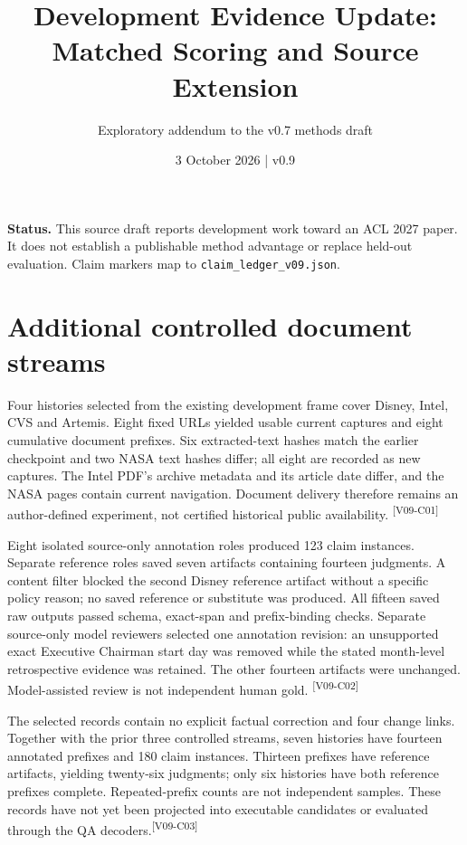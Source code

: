 \documentclass[10pt,letterpaper]{article}
\title{Development Evidence Update: Matched Scoring and Source Extension}
\author{Exploratory addendum to the v0.7 methods draft}
\date{3 October 2026 \quad | \quad v0.9}
\newcommand{\claim}[1]{\textsuperscript{\scriptsize[#1]}}
\begin{document}
\maketitle
\noindent\textbf{Status.} This source draft reports development work toward an
ACL 2027 paper. It does not establish a publishable method advantage or replace
held-out evaluation. Claim markers map to \texttt{claim\_ledger\_v09.json}.

\section{Additional controlled document streams}
\label{sec:sources}
Four histories selected from the existing development frame cover Disney,
Intel, CVS and Artemis. Eight fixed URLs yielded usable current captures and
eight cumulative document prefixes. Six extracted-text hashes match the earlier
checkpoint and two NASA text hashes differ; all eight are recorded as new
captures. The Intel PDF's archive metadata and its article date differ, and the
NASA pages contain current navigation. Document delivery therefore remains an
author-defined experiment, not certified historical public availability.
\claim{V09-C01}

Eight isolated source-only annotation roles produced 123 claim instances.
Separate reference roles saved seven artifacts containing fourteen judgments.
A content filter blocked the second Disney reference artifact without a
specific policy reason; no saved reference or substitute was produced. All
fifteen saved raw outputs passed schema, exact-span and prefix-binding checks.
Separate source-only model reviewers selected one annotation revision: an
unsupported exact Executive Chairman start day was removed while the stated
month-level retrospective evidence was retained. The other fourteen artifacts
were unchanged. Model-assisted review is not independent human gold.
\claim{V09-C02}

The selected records contain no explicit factual correction and four change
links. Together with the prior three controlled streams, seven histories have
fourteen annotated prefixes and 180 claim instances. Thirteen prefixes have
reference artifacts, yielding twenty-six judgments; only six histories have
both reference prefixes complete. Repeated-prefix counts are not independent
samples. These records have not yet been projected into executable candidates
or evaluated through the QA decoders.\claim{V09-C03}
\end{document}
